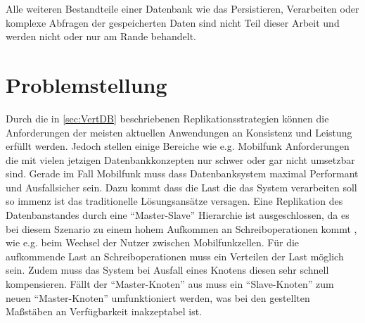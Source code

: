\documentclass[a4paper,11pt,oneside,%
headsepline,												%
footsepline,												%
bibtotocnumbered									%
]{scrreprt}
\begin{document}
Alle weiteren Bestandteile einer Datenbank wie das Persistieren, Verarbeiten oder komplexe Abfragen der gespeicherten Daten sind nicht Teil dieser Arbeit und werden nicht oder nur am Rande behandelt.  

\section{Problemstellung}
Durch die in \autoref{sec:VertDB} beschriebenen Replikationsstrategien können die Anforderungen der meisten aktuellen Anwendungen an Konsistenz und Leistung erfüllt werden. Jedoch stellen einige Bereiche wie e.g. Mobilfunk Anforderungen die mit vielen jetzigen Datenbankkonzepten nur schwer oder gar nicht umsetzbar sind. Gerade im Fall Mobilfunk muss dass Datenbanksystem maximal Performant und Ausfallsicher sein. Dazu kommt dass die Last die das System verarbeiten soll so immenz ist das traditionelle Lösungsansätze versagen. Eine Replikation des Datenbanstandes durch eine \enquote{Master-Slave} Hierarchie ist ausgeschlossen, da es bei diesem Szenario zu einem hohem Aufkommen an Schreiboperationen kommt
, wie e.g. beim Wechsel der Nutzer zwischen Mobilfunkzellen. Für die aufkommende Last an Schreiboperationen muss ein Verteilen der Last möglich sein. Zudem muss das System bei Ausfall eines Knotens diesen sehr schnell kompensieren. Fällt der \enquote{Master-Knoten} aus muss ein \enquote{Slave-Knoten} zum neuen \enquote{Master-Knoten} umfunktioniert werden, was bei den gestellten Maßstäben an Verfügbarkeit inakzeptabel ist.\\
\end{document}
